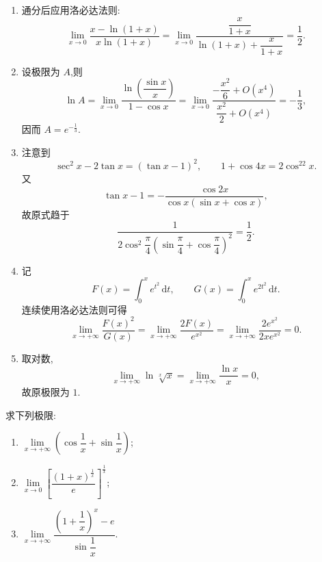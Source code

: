 \begin{solution}
    \begin{enumerate}
        \item 通分后应用洛必达法则:
              \[
                  \lim\limits_{x\to0}
                  \dfrac{x-\ln(1+x)}{x\ln(1+x)}
                  =\lim\limits_{x\to0}\dfrac{\dfrac{x}{1+x}}{\ln(1+x)+\dfrac{x}{1+x}}
                  =\dfrac{1}{2}.
              \]
        \item 设极限为 $A$,则
              \[
                  \ln A
                  =\lim\limits_{x\to0}
                  \dfrac{\ln\left(\dfrac{\sin x}{x}\right)}{1-\cos x}
                  =\lim\limits_{x\to0}\dfrac{-\dfrac{x^2}{6}+O(x^4)}{\dfrac{x^2}{2}+O(x^4)}
                  =-\dfrac{1}{3},
              \]
              因而 $A=e^{-\frac{1}{3}}$.
        \item 注意到
              \[
                  \sec^2x-2\tan x=(\tan x-1)^2,
                  \qquad
                  1+\cos4x=2\cos^22x.
              \]
              又
              \[
                  \tan x-1=-\dfrac{\cos2x}{\cos x(\sin x+\cos x)},
              \]
              故原式趋于
              \[
                  \dfrac{1}{2\cos^2\dfrac{\pi}{4}
                      \left(\sin\dfrac{\pi}{4}+\cos\dfrac{\pi}{4}\right)^2}
                  =\dfrac{1}{2}.
              \]
        \item 记
              \[
                  F(x)=\int_0^x e^{t^2}\,\mathrm{d}t,
                  \qquad
                  G(x)=\int_0^x e^{2t^2}\,\mathrm{d}t.
              \]
              连续使用洛必达法则可得
              \[
                  \lim\limits_{x\to+\infty}\dfrac{F(x)^2}{G(x)}
                  =\lim\limits_{x\to+\infty}\dfrac{2F(x)}{e^{x^2}}
                  =\lim\limits_{x\to+\infty}\dfrac{2e^{x^2}}{2xe^{x^2}}=0.
              \]
        \item 取对数,
              \[
                  \lim\limits_{x\to+\infty}\ln\sqrt[x]{x}
                  =\lim\limits_{x\to+\infty}\dfrac{\ln x}{x}=0,
              \]
              故原极限为 $1$.
    \end{enumerate}
\end{solution}

\begin{example}
    求下列极限:
    \begin{enumerate}
        \item $\displaystyle
                  \lim\limits_{x\to+\infty}\left(\cos\dfrac{1}{x}+\sin\dfrac{1}{x}\right)$;
        \item $\displaystyle
                  \lim\limits_{x\to0}
                  \left[\dfrac{(1+x)^{\frac{1}{x}}}{e}\right]^{\frac{1}{x}}$;
        \item $\displaystyle
                  \lim\limits_{x\to+\infty}
                  \dfrac{\left(1+\dfrac{1}{x}\right)^x-e}{\sin\dfrac{1}{x}}$.
    \end{enumerate}
\end{example}
\exampleblank

